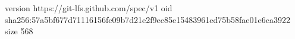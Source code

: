 version https://git-lfs.github.com/spec/v1
oid sha256:57a5bf677d71116156fc09b7d21e2f9ec85e15483961ed75b58fae01e6ca3922
size 568
